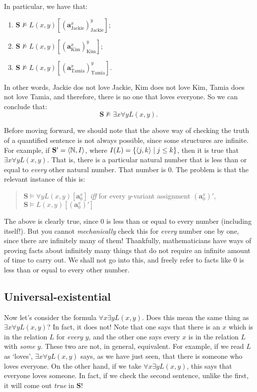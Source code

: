 In particular, we have that:

\begin{enumerate}
	\item $\mathbf{S} \not\models L(x,y)[(\mathbf{a}^x_\text{Jackie})^y_\text{Jackie}]$;
	\item $\mathbf{S} \not\models L(x,y)[(\mathbf{a}^x_\text{Kim})^y_\text{Kim}]$;
	\item $\mathbf{S} \not\models L(x,y)[(\mathbf{a}^x_\text{Tamia})^y_\text{Tamia}]$.
\end{enumerate}

In other words, Jackie dos not love Jackie, Kim does not love Kim, Tamia does not love Tamia, and therefore, there is no one that loves everyone. So we can conclude that:
\[
\mathbf{S} \not\models \exists x \forall y L(x, y).
\]

Before moving forward, we should note that the above way of checking the truth of a quantified sentence is not always possible, since some structures are infinite. For example, if $\mathbf{S}'=\langle\mathbb{N}, I\rangle$, where $I(L)=\{\langle j, k\rangle \mid j\leq k\}$, then it is true that $\exists x \forall y L(x, y)$. That is, there is a particular natural number that is less than or equal to \textit{every} other natural number. That number is $0$. The problem is that the relevant instance of this is: 

\begin{quote}
	$\mathbf{S} \models \forall y L(x,y)[\mathbf{a}^x_0]$ \textit{iff} for every $y$-variant assignment $(\mathbf{a}^x_0)'$, $\mathbf{S} \models L(x,y)[(\mathbf{a}^x_0)']$
\end{quote}

The above is clearly true, since $0$ is less than or equal to every number (including itself!). But you cannot \textit{mechanically} check this for \textit{every} number one by one, since there are infinitely many of them! Thankfully, mathematicians have ways of proving facts about infinitely many things that do not require an infinite amount of time to carry out. We shall not go into this, and freely refer to facts like $0$ is less than or equal to every other number. 

\subsection{Universal-existential}

Now let's consider the formula $\forall x \exists y L(x, y)$. Does this mean the same thing as $\exists x \forall y L(x,y)$? In fact, it does not! Note that one says that there is an $x$ which is in the relation $L$ for \textit{every} $y$, and the other one says every $x$ is in the relation $L$ with \textit{some} $y$. These two are not, in general, equivalent. For example, if we read $L$ as `loves', $\exists x \forall y L(x,y)$ says, as we have just seen, that there is someone who loves everyone. On the other hand, if we take $\forall x \exists y L(x, y)$, this says that everyone loves someone. In fact, if we check the second sentence, unlike the first, it will come out \textit{true} in $\mathbf{S}$!

